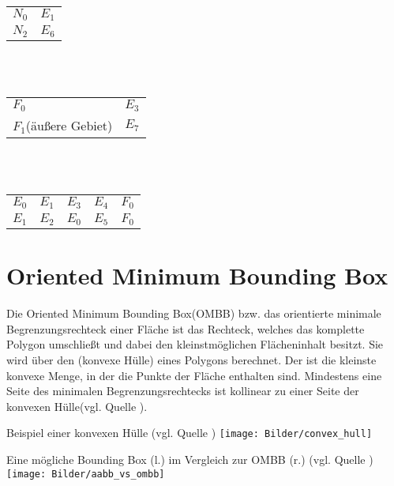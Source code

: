 \begin{tabularx}{\textwidth}{|Y|Y|}
	\hline
	 &  \\
	\hline
	$N_0$ & $E_1$ \\
	\hline
	$N_2$ & $E_6$ \\
	\hline
\end{tabularx}\\\\

\begin{tabularx}{\textwidth}{|Y|Y|}
	\hline
	 &  \\
	\hline
	$F_0$ & $E_3$ \\
	\hline
	$F_1$(äußere Gebiet) & $E_7$ \\
	\hline
\end{tabularx}\\\\

\begin{tabularx}{\textwidth}{|Y|Y|Y|Y|Y|}
	\hline
	 &  &  &  &  \\
	\hline
	$E_0$ & $E_1$ & $E_3$& $E_4$& $F_0$ \\
	\hline
	$E_1$ & $E_2$ & $E_0$& $E_5$& $F_0$ \\
	\hline
\end{tabularx}

\section{Oriented Minimum Bounding Box}
Die Oriented Minimum Bounding Box(OMBB) bzw. das orientierte minimale Begrenzungsrechteck einer Fläche ist das Rechteck, welches das komplette Polygon umschließt und dabei den kleinstmöglichen Flächeninhalt besitzt.
Sie wird über den  (konvexe Hülle) eines Polygons berechnet.
Der  ist die kleinste konvexe Menge, in der die Punkte der Fläche enthalten sind.
Mindestens eine Seite des minimalen Begrenzungsrechtecks ist kollinear zu einer Seite der konvexen Hülle(vgl. Quelle \cite{ombb}).

\begin{Bild}{Beispiel einer konvexen Hülle (vgl. Quelle \cite{ombb})}
	\texttt{[image: Bilder/convex\_hull]}
\end{Bild}
\begin{Bild}{Eine mögliche Bounding Box (l.) im Vergleich zur OMBB (r.) (vgl. Quelle \cite{ombb})}
	\texttt{[image: Bilder/aabb\_vs\_ombb]}
\end{Bild}

